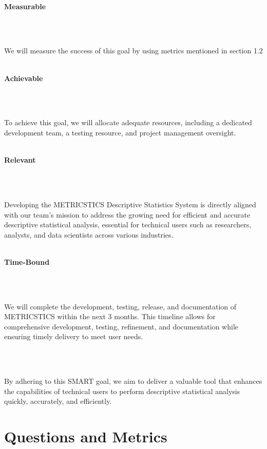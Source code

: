     \strut \\
    \textbf{\large Measurable}
    \strut \\
    \strut \\
    We will measure the success of this goal by using metrics mentioned in section 1.2
    
    \strut \\
    \textbf{\large Achievable}
    \strut \\
    \strut \\
    To achieve this goal, we will allocate adequate resources, including a dedicated development team, a testing resource, and project management oversight.
    
    \strut \\
    \textbf{\large Relevant}
    \strut \\
    \strut \\
    Developing the METRICSTICS Descriptive Statistics System is directly aligned with our team's mission to address the growing need for efficient and accurate descriptive statistical analysis, essential for technical users such as researchers, analysts, and data scientists across various industries.
    
    \strut \\
    \textbf{\large Time-Bound}
    \strut \\
    \strut \\
    We will complete the development, testing, release, and documentation of METRICSTICS within the next 3 months. This timeline allows for comprehensive development, testing, refinement, and documentation while ensuring timely delivery to meet user needs.
    \strut \\
    \strut \\
    By adhering to this SMART goal, we aim to deliver a valuable tool that enhances the capabilities of technical users to perform descriptive statistical analysis quickly, accurately, and efficiently.
    
    \pagebreak

    \section{Questions and Metrics}
    
